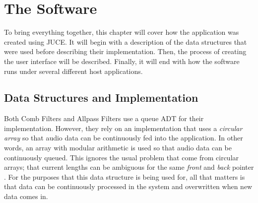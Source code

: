 \chapter{The Software}
\hspace*{-0.15cm}To bring everything together, this chapter will cover how the application was created using JUCE. It will begin with a description of the data structures that were used before describing their implementation. Then, the process of creating the user interface will be described. Finally, it will end with how the software runs under several different host applications.
\section{Data Structures and Implementation}
Both Comb Filters and Allpass Filters use a queue ADT for their implementation. However, they rely on an implementation that uses a \textit{circular array} so that audio data can be continuously fed into the application. In other words, an array with modular arithmetic is used so that audio data can be continuously queued. This ignores the usual problem that come from circular arrays; that current lengths can be ambiguous for the same \textit{front} and \textit{back} pointer \cite{carrano2016data}. For the purposes that this data structure is being used for, all that matters is that data can be continuously processed in the system and overwritten when new data comes in.

